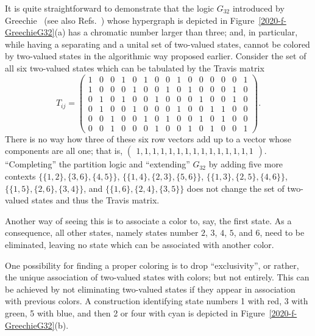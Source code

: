 \documentclass[%
12pt,
prereprint,
showpacs,
showkeys,
preprintnumbers,
amsmath,amssymb,
aps,
pra,
longbibliography,
notitlepage
]{revtex4-1}
\theoremstyle{definition}
\begin{document}
	It is quite straightforward to demonstrate that the logic $G_{32}$ introduced by Greechie~\cite[Figure~6, p.~121]{greechie:71}
	(see also Refs.~\cite{Holland1975,Bennett-MC-1970,Greechie1974,Greechie-Suppes1976})
	whose hypergraph is depicted in Figure~\ref{2020-f-GreechieG32}(a) has a chromatic number larger than three;
	and, in particular, while having a separating and a unital set of two-valued states, cannot be colored by two-valued states in the algorithmic way proposed earlier.
	Consider the set of all six two-valued states which can be tabulated by the Travis matrix
	\begin{equation}
		T_{ij}=\begin{pmatrix}
			1&0&0&1&0&1&0&0&1&0&0&0&0&0&1\\
			1&0&0&0&1&0&0&1&0&1&0&0&0&1&0\\
			0&1&0&1&0&0&1&0&0&0&1&0&0&1&0\\
			0&1&0&0&1&0&0&0&1&0&0&1&1&0&0\\
			0&0&1&0&0&1&0&1&0&0&1&0&1&0&0\\
			0&0&1&0&0&0&1&0&0&1&0&1&0&0&1
		\end{pmatrix}
		.
	\end{equation}
	There is no way how three of these six row vectors add up to
	a vector whose components are all one; that is,
	$
	\begin{pmatrix}
		1,1,1,1,1,1,1,1,1,1,1,1,1,1,1
	\end{pmatrix}
	$.
	``Completing'' the partition logic and ``extending''
	$G_{32}$ by adding five more contexts
	$\{\{1, 2\}, \{3, 6\}, \{4, 5\}\}$,
	$\{\{1, 4\}, \{2, 3\}, \{5, 6\}\}$,
	$\{\{1, 3\}, \{2, 5\}, \{4, 6\}\}$,
	$\{\{1, 5\}, \{2, 6\}, \{3, 4\}\}$, and
	$\{\{1, 6\}, \{2, 4\}, \{3, 5\}\}$
	does not change the set of two-valued states and thus the Travis matrix.
	
	
	Another way of seeing this is to associate a color to, say, the first state.
	As a consequence, all other states, namely states number
	$2$,
	$3$,
	$4$,
	$5$, and
	$6$, need to be eliminated,
	leaving no state which can be associated with
	another color.
	
	One possibility for finding a proper coloring is to drop ``exclusivity'', or rather, the unique association of two-valued states with colors; but not entirely. This can be achieved by not eliminating two-valued states if they appear in association with previous colors. A construction identifying state numbers 1 with red, 3 with green, 5 with blue, and then 2 or four with cyan is depicted in Figure~\ref{2020-f-GreechieG32}(b).
	
\end{document}
